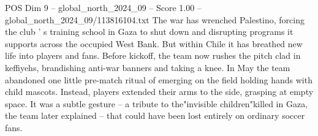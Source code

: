 \begin{textsample}{POS Dim 9 – global\_north\_2024\_09 – Score 1.00 – global\_north\_2024\_09/113816104.txt}
The war has wrenched Palestino, forcing the club ' s training school in Gaza to shut down and disrupting programs it supports across the occupied West Bank.
But within Chile it has breathed new life into players and fans.
Before kickoff, the team now rushes the pitch clad in keffiyehs, brandishing anti-war banners and taking a knee.
In May the team abandoned one little pre-match ritual of emerging on the field holding hands with child mascots.
Instead, players extended their arms to the side, grasping at empty space.
It was a subtle gesture -- a tribute to the"invisible children"killed in Gaza, the team later explained -- that could have been lost entirely on ordinary soccer fans.

\end{textsample}
